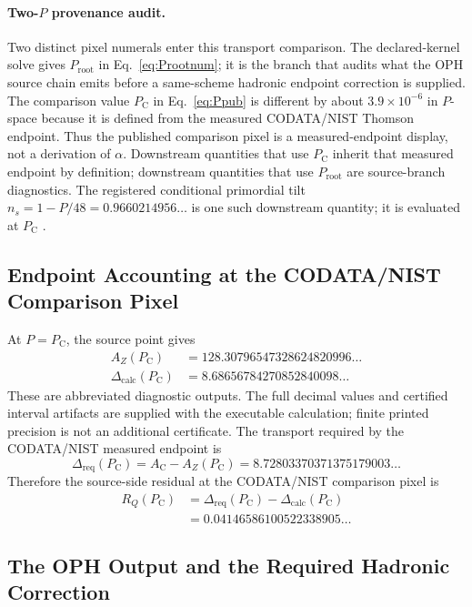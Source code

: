 \documentclass[11pt]{article}
\theoremstyle{remark}
\newcommand{\AZ}{A_Z}
\newcommand{\Ppub}{P_{\mathrm C}}
\newcommand{\Rq}{R_Q}
\newcommand{\Dcalc}{\Delta_{\mathrm{calc}}}
\newcommand{\Dreq}{\Delta_{\mathrm{req}}}
\begin{document}
\paragraph{Two-\(P\) provenance audit.}
Two distinct pixel numerals enter this transport comparison.  The
declared-kernel solve gives \(P_{\mathrm{root}}\) in Eq.~\eqref{eq:Prootnum}; it is the
branch that audits what the OPH source chain emits before a same-scheme
hadronic endpoint correction is supplied.  The comparison value \(\Ppub\) in
Eq.~\eqref{eq:Ppub} is different by about \(3.9\times10^{-6}\) in \(P\)-space
because it is defined from the measured CODATA/NIST Thomson endpoint.  Thus
the published comparison pixel is a measured-endpoint display, not a
derivation of \(\alpha\).  Downstream quantities that use \(\Ppub\) inherit
that measured endpoint by definition; downstream quantities that use
\(P_{\mathrm{root}}\) are source-branch diagnostics. The registered conditional primordial tilt
\(n_s=1-P/48=0.9660214956\ldots\) is one such downstream quantity; it is evaluated at \(\Ppub\)
\cite{ophpublicdata,ophladder}.

\subsection{Endpoint Accounting at the CODATA/NIST Comparison Pixel}
\label{sec:alpha-step-17}

At \(P=\Ppub\), the source point gives
\begin{align}
\AZ(\Ppub)
&=
128.30796547328624820996\ldots
\label{eq:AZpub}\\
\Dcalc(\Ppub)
&=
8.68656784270852840098\ldots
\label{eq:Dcalcpub}
\end{align}
These are abbreviated diagnostic outputs. The full decimal values and
certified interval artifacts are supplied with the executable calculation;
finite printed precision is not an additional certificate.
The transport required by the CODATA/NIST measured endpoint is
\begin{equation}
\Dreq(\Ppub)
=
A_{\mathrm C}-\AZ(\Ppub)
=
8.72803370371375179003\ldots
\label{eq:Dreqpub}
\end{equation}
Therefore the source-side residual at the CODATA/NIST comparison pixel is
\begin{align}
\Rq(\Ppub)
&=
\Dreq(\Ppub)-\Dcalc(\Ppub)
\nonumber\\
&=
0.04146586100522338905\ldots
\label{eq:RQpub}
\end{align}


\subsection{The OPH Output and the Required Hadronic Correction}
\label{sec:alpha-step-18}
\end{document}
